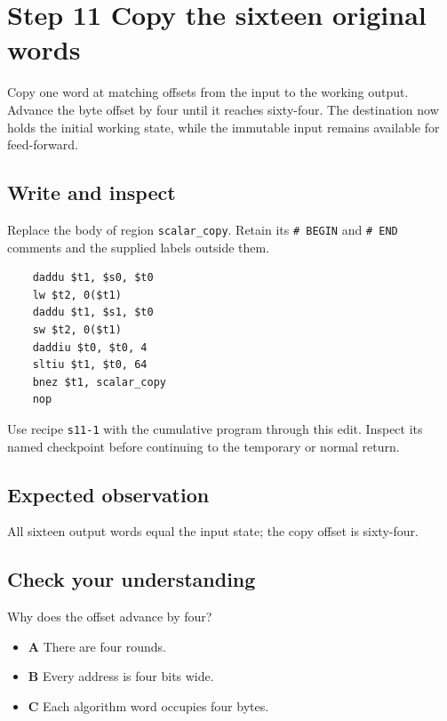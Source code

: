 \section{Step 11 Copy the sixteen original words}\label{chacha-s11}

Copy one word at matching offsets from the input to the working output. Advance the byte offset by four until it reaches sixty-four. The destination now holds the initial working state, while the immutable input remains available for feed-forward.

\subsection{Write and inspect}
Replace the body of region \texttt{scalar\_copy}. Retain its \texttt{\# BEGIN} and \texttt{\# END} comments and the supplied labels outside them.

\begin{verbatim}
    daddu $t1, $s0, $t0
    lw $t2, 0($t1)
    daddu $t1, $s1, $t0
    sw $t2, 0($t1)
    daddiu $t0, $t0, 4
    sltiu $t1, $t0, 64
    bnez $t1, scalar_copy
    nop
\end{verbatim}

Use recipe \texttt{s11-1} with the cumulative program through this edit. Inspect its named checkpoint before continuing to the temporary or normal return.

\subsection{Expected observation}
All sixteen output words equal the input state; the copy offset is sixty-four.

\subsection{Check your understanding}
Why does the offset advance by four?

\begin{itemize}
  \item \textbf{A} There are four rounds.
  \item \textbf{B} Every address is four bits wide.
  \item \textbf{C} Each algorithm word occupies four bytes.
\end{itemize}
